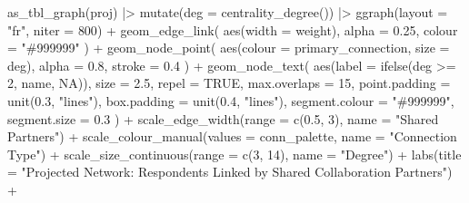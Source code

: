 \documentclass[
  letterpaper,
  DIV=11,
  numbers=noendperiod]{scrartcl}
\newenvironment{Shaded}{\begin{snugshade}}{\end{snugshade}}
\newcommand{\AttributeTok}[1]{\textcolor[rgb]{0.40,0.45,0.13}{#1}}
\newcommand{\ConstantTok}[1]{\textcolor[rgb]{0.56,0.35,0.01}{#1}}
\newcommand{\DecValTok}[1]{\textcolor[rgb]{0.68,0.00,0.00}{#1}}
\newcommand{\FloatTok}[1]{\textcolor[rgb]{0.68,0.00,0.00}{#1}}
\newcommand{\FunctionTok}[1]{\textcolor[rgb]{0.28,0.35,0.67}{#1}}
\newcommand{\NormalTok}[1]{\textcolor[rgb]{0.00,0.23,0.31}{#1}}
\newcommand{\SpecialCharTok}[1]{\textcolor[rgb]{0.37,0.37,0.37}{#1}}
\newcommand{\StringTok}[1]{\textcolor[rgb]{0.13,0.47,0.30}{#1}}
\begin{document}
\begin{Shaded}
\begin{Highlighting}[]
\FunctionTok{as\_tbl\_graph}\NormalTok{(proj) }\SpecialCharTok{|\textgreater{}}
  \FunctionTok{mutate}\NormalTok{(}\AttributeTok{deg =} \FunctionTok{centrality\_degree}\NormalTok{()) }\SpecialCharTok{|\textgreater{}}
  \FunctionTok{ggraph}\NormalTok{(}\AttributeTok{layout =} \StringTok{"fr"}\NormalTok{, }\AttributeTok{niter =} \DecValTok{800}\NormalTok{) }\SpecialCharTok{+}
  \FunctionTok{geom\_edge\_link}\NormalTok{(}
    \FunctionTok{aes}\NormalTok{(}\AttributeTok{width =}\NormalTok{ weight),}
    \AttributeTok{alpha =} \FloatTok{0.25}\NormalTok{, }\AttributeTok{colour =} \StringTok{"\#999999"}
\NormalTok{  ) }\SpecialCharTok{+}
  \FunctionTok{geom\_node\_point}\NormalTok{(}
    \FunctionTok{aes}\NormalTok{(}\AttributeTok{colour =}\NormalTok{ primary\_connection, }\AttributeTok{size =}\NormalTok{ deg),}
    \AttributeTok{alpha =} \FloatTok{0.8}\NormalTok{, }\AttributeTok{stroke =} \FloatTok{0.4}
\NormalTok{  ) }\SpecialCharTok{+}
  \FunctionTok{geom\_node\_text}\NormalTok{(}
    \FunctionTok{aes}\NormalTok{(}\AttributeTok{label =} \FunctionTok{ifelse}\NormalTok{(deg }\SpecialCharTok{\textgreater{}=} \DecValTok{2}\NormalTok{, name, }\ConstantTok{NA}\NormalTok{)),}
    \AttributeTok{size =} \FloatTok{2.5}\NormalTok{, }\AttributeTok{repel =} \ConstantTok{TRUE}\NormalTok{, }\AttributeTok{max.overlaps =} \DecValTok{15}\NormalTok{,}
    \AttributeTok{point.padding =} \FunctionTok{unit}\NormalTok{(}\FloatTok{0.3}\NormalTok{, }\StringTok{"lines"}\NormalTok{),}
    \AttributeTok{box.padding =} \FunctionTok{unit}\NormalTok{(}\FloatTok{0.4}\NormalTok{, }\StringTok{"lines"}\NormalTok{),}
    \AttributeTok{segment.colour =} \StringTok{"\#999999"}\NormalTok{, }\AttributeTok{segment.size =} \FloatTok{0.3}
\NormalTok{  ) }\SpecialCharTok{+}
  \FunctionTok{scale\_edge\_width}\NormalTok{(}\AttributeTok{range =} \FunctionTok{c}\NormalTok{(}\FloatTok{0.5}\NormalTok{, }\DecValTok{3}\NormalTok{), }\AttributeTok{name =} \StringTok{"Shared Partners"}\NormalTok{) }\SpecialCharTok{+}
  \FunctionTok{scale\_colour\_manual}\NormalTok{(}\AttributeTok{values =}\NormalTok{ conn\_palette, }\AttributeTok{name =} \StringTok{"Connection Type"}\NormalTok{) }\SpecialCharTok{+}
  \FunctionTok{scale\_size\_continuous}\NormalTok{(}\AttributeTok{range =} \FunctionTok{c}\NormalTok{(}\DecValTok{3}\NormalTok{, }\DecValTok{14}\NormalTok{), }\AttributeTok{name =} \StringTok{"Degree"}\NormalTok{) }\SpecialCharTok{+}
  \FunctionTok{labs}\NormalTok{(}\AttributeTok{title =} \StringTok{"Projected Network: Respondents Linked by Shared Collaboration Partners"}\NormalTok{) }\SpecialCharTok{+}

\end{Highlighting}
\end{Shaded}
\end{document}

